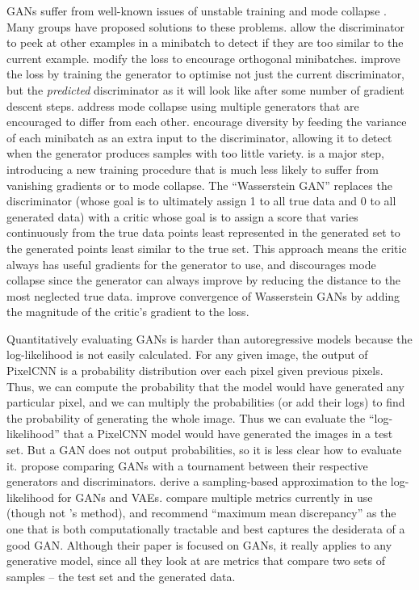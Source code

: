 \documentclass[10pt,a4paper]{article}
\newcommand{\nquote}[1]{``{#1}''}
\begin{document}
GANs suffer from well-known issues of unstable training and mode collapse \cite{gantechniques}. Many groups have proposed solutions to these problems. \cite{gantechniques} allow the discriminator to peek at other examples in a minibatch to detect if they are too similar to the current example. \cite{energygan} modify the loss to encourage orthogonal minibatches. \cite{unrolledgan} improve the loss by training the generator to optimise not just the current discriminator, but the \emph{predicted} discriminator as it will look like after some number of gradient descent steps. \cite{multiagentgan} address mode collapse using multiple generators that are encouraged to differ from each other. \cite{progressivegrowing} encourage diversity by feeding the variance of each minibatch as an extra input to the discriminator, allowing it to detect when the generator produces samples with too little variety. \cite{wgan} is a major step, introducing a new training procedure that is much less likely to suffer from vanishing gradients or to mode collapse. The \nquote{Wasserstein GAN} replaces the discriminator (whose goal is to ultimately assign 1 to all true data and 0 to all generated data) with a critic whose goal is to assign a score that varies continuously from the true data points least represented in the generated set to the generated points least similar to the true set. This approach means the critic always has useful gradients for the generator to use, and discourages mode collapse since the generator can always improve by reducing the distance to the most neglected true data. \cite{improvedwgans} improve convergence of Wasserstein GANs by adding the magnitude of the critic's gradient to the loss.

Quantitatively evaluating GANs is harder than autoregressive models because the log-likelihood is not easily calculated. For any given image, the output of PixelCNN is a probability distribution over each pixel given previous pixels. Thus, we can compute the probability that the model would have generated any particular pixel, and we can multiply the probabilities (or add their logs) to find the probability of generating the whole image. Thus we can evaluate the \nquote{log-likelihood} that a PixelCNN model would have generated the images in a test set. But a GAN does not output probabilities, so it is less clear how to evaluate it. \cite{gantournament} propose comparing GANs with a tournament between their respective generators and discriminators. \cite{likelihoodestimation} derive a sampling-based approximation to the log-likelihood for GANs and VAEs. \cite{ganmetrics} compare multiple metrics currently in use (though not \cite{likelihoodestimation}'s method), and recommend \nquote{maximum mean discrepancy} \cite{mmd} as the one that is both computationally tractable and best captures the desiderata of a good GAN. Although their paper is focused on GANs, it really applies to any generative model, since all they look at are metrics that compare two sets of samples -- the test set and the generated data.
\end{document}

